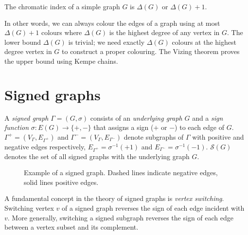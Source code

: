 \begin{theorem}[Vizing]
    The chromatic index of a simple graph $G$ is $\Delta(G)$ or $\Delta(G) + 1$.
\end{theorem}

In other words, we can always colour the edges of a graph using at most $\Delta(G) + 1$ colours where $\Delta(G)$ is the highest degree of any vertex in $G$. The lower bound $\Delta(G)$ is trivial; we need exactly $\Delta(G)$ colours at the highest degree vertex in $G$ to construct a proper colouring. The Vizing theorem proves the upper bound using Kempe chains.

\section{Signed graphs}

A \textit{signed graph} $\Gamma = (G, \sigma)$ consists of an \textit{underlying graph} $G$ and a \textit{sign function} $\sigma : E(G) \rightarrow \{+,-\}$ that assigns a sign ($+$ or $-$) to each edge of $G$. $\Gamma ^+ = (V _{\Gamma}, E _{\Gamma ^+})$ and $\Gamma ^- = (V _{\Gamma}, E _{\Gamma ^-})$ denote subgraphs of $\Gamma$ with positive and negative edges respectively, $E _{\Gamma ^+} = \sigma ^{-1} (+1)$ and $E _{\Gamma ^-} = \sigma ^{-1} (-1)$. $\mathcal{S} (G)$ denotes the set of all signed graphs with the underlying graph $G$.

\begin{figure}[h]
    \centering
    \caption[Example of a signed graph]{Example of a signed graph. Dashed lines indicate negative edges, solid lines positive edges.}
\end{figure}

A fundamental concept in the theory of signed graphs is \textit{vertex switching}. Switching vertex $v$ of a signed graph reverses the sign of each edge incident with $v$. More generally, switching a signed subgraph reverses the sign of each edge between a vertex subset and its complement.

